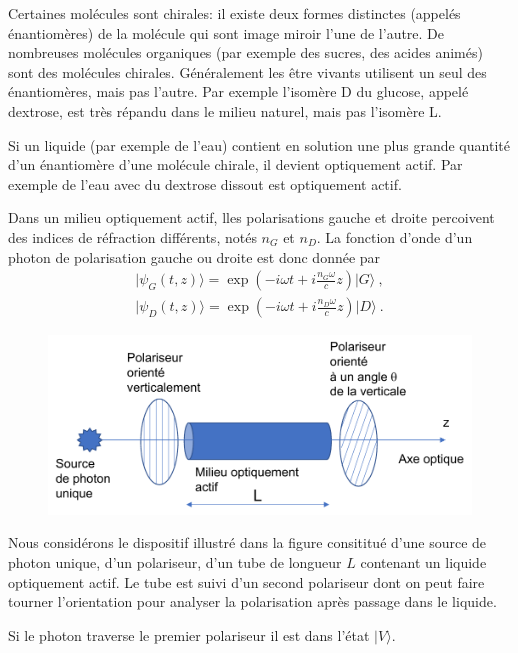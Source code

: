 Certaines molécules sont chirales: il existe deux formes distinctes (appelés énantiomères) de la molécule qui sont image miroir l'une de l'autre. De nombreuses molécules organiques (par exemple des sucres, des acides animés) sont des molécules chirales. Généralement les être vivants utilisent un seul des énantiomères, mais pas l'autre. Par exemple l'isomère D du glucose, appelé dextrose, est très répandu dans le milieu naturel, mais pas l'isomère L.

Si un liquide (par exemple de l'eau) contient en solution une plus grande quantité d'un énantiomère d'une molécule chirale, il devient optiquement actif. Par exemple de l'eau avec du dextrose dissout est optiquement actif.

Dans un milieu optiquement actif, lles polarisations gauche et droite percoivent des indices de réfraction différents, notés $n_G$ et $n_D$.
La fonction d'onde d'un photon de polarisation gauche ou droite est donc donnée par
\begin{eqnarray}
\vert \psi_G(t,z)\rangle  = \exp \left( -i \omega t + i \frac{n_G \omega}{c} z\right) \vert G\rangle  \ , \nonumber\\
 \vert  \psi_D(t,z)  \rangle =  \exp \left(  -i \omega t + i \frac{n_D \omega}{c} z \right) \vert D\rangle \  .
 \label{eq:psiGD}
\end{eqnarray}




\begin{figure}
\centering
\includegraphics{Pictures/Fig-Pol.pdf}
\end{figure}

Nous considérons le dispositif illustré dans la figure consititué d'une source de photon unique, d'un polariseur, d'un tube de longueur $L$ contenant un liquide optiquement actif. Le tube est suivi d'un second polariseur dont on peut faire tourner l'orientation pour analyser la polarisation après passage dans le liquide.

Si le photon traverse le premier polariseur il est dans l'état $\vert V \rangle$.


